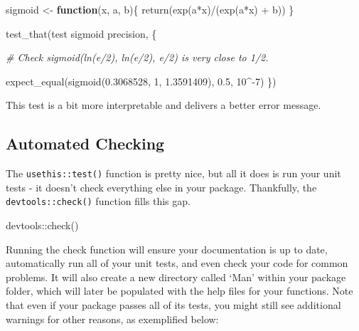 \documentclass[
]{book}
\newenvironment{Shaded}{\begin{snugshade}}{\end{snugshade}}
\newcommand{\CommentTok}[1]{\textcolor[rgb]{0.56,0.35,0.01}{\textit{#1}}}
\newcommand{\ControlFlowTok}[1]{\textcolor[rgb]{0.13,0.29,0.53}{\textbf{#1}}}
\newcommand{\DecValTok}[1]{\textcolor[rgb]{0.00,0.00,0.81}{#1}}
\newcommand{\FloatTok}[1]{\textcolor[rgb]{0.00,0.00,0.81}{#1}}
\newcommand{\FunctionTok}[1]{\textcolor[rgb]{0.00,0.00,0.00}{#1}}
\newcommand{\NormalTok}[1]{#1}
\newcommand{\OtherTok}[1]{\textcolor[rgb]{0.56,0.35,0.01}{#1}}
\newcommand{\SpecialCharTok}[1]{\textcolor[rgb]{0.00,0.00,0.00}{#1}}
\newcommand{\StringTok}[1]{\textcolor[rgb]{0.31,0.60,0.02}{#1}}
\begin{document}
\begin{Shaded}
\begin{Highlighting}[]
\NormalTok{sigmoid }\OtherTok{\textless{}{-}} \ControlFlowTok{function}\NormalTok{(x, a, b)\{}
  \FunctionTok{return}\NormalTok{(}\FunctionTok{exp}\NormalTok{(a}\SpecialCharTok{*}\NormalTok{x)}\SpecialCharTok{/}\NormalTok{(}\FunctionTok{exp}\NormalTok{(a}\SpecialCharTok{*}\NormalTok{x) }\SpecialCharTok{+}\NormalTok{ b))}
\NormalTok{\}}

\FunctionTok{test\_that}\NormalTok{(}\StringTok{\textquotesingle{}test sigmoid precision\textquotesingle{}}\NormalTok{, \{}

  \CommentTok{\# Check sigmoid(ln(e/2), ln(e/2), e/2) is very close to 1/2.}

  \FunctionTok{expect\_equal}\NormalTok{(}\FunctionTok{sigmoid}\NormalTok{(}\FloatTok{0.3068528}\NormalTok{, }\DecValTok{1}\NormalTok{, }\FloatTok{1.3591409}\NormalTok{), }\FloatTok{0.5}\NormalTok{, }\DecValTok{10}\SpecialCharTok{\^{}{-}}\DecValTok{7}\NormalTok{)}
\NormalTok{\})}
\end{Highlighting}
\end{Shaded}

This test is a bit more interpretable and delivers a better error message.

\hypertarget{automated-checking}{%
\subsection{Automated Checking}\label{automated-checking}}

The \texttt{usethis::test()} function is pretty nice, but all it does is run your unit tests - it doesn't check everything else in your package. Thankfully, the \texttt{devtools::check()} function fills this gap.

\begin{Shaded}
\begin{Highlighting}[]
\NormalTok{devtools}\SpecialCharTok{::}\FunctionTok{check}\NormalTok{()}
\end{Highlighting}
\end{Shaded}

Running the check function will ensure your documentation is up to date, automatically run all of your unit tests, and even check your code for common problems. It will also create a new directory called `Man' within your package folder, which will later be populated with the help files for your functions. Note that even if your package passes all of its tests, you might still see additional warnings for other reasons, as exemplified below:
\end{document}
